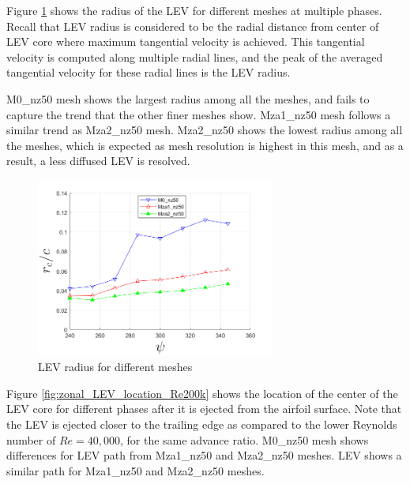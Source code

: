 Figure \ref{fig:zonal_LEV_radius_Re200k} shows the radius of the LEV for different meshes at multiple phases.
Recall that LEV radius is considered to be
the radial distance from center of LEV core where maximum tangential velocity is achieved. This tangential velocity is computed along multiple radial lines, and the peak of the averaged tangential velocity for these radial lines is the LEV radius.

M0\_nz50 mesh shows the largest radius among all the meshes, and fails to capture the trend that the other finer meshes show.
Mza1\_nz50 mesh follows a similar trend as Mza2\_nz50 mesh.
Mza2\_nz50 shows the lowest radius among all the meshes, which is expected as mesh resolution is highest in this mesh, and as a result, a less diffused LEV is resolved.


\begin{figure}[H]
	\centering
	\includegraphics[width=0.7\textwidth]{figures/zonal_adapt_results/LEV_Re200k/LEV_radius_vp}
	\caption{ LEV radius for different meshes}
	\label{fig:zonal_LEV_radius_Re200k}
\end{figure}

Figure \ref{fig:zonal_LEV_location_Re200k} shows the location of the center of the LEV core for different phases after it is ejected from the airfoil surface.
Note that the LEV is ejected closer to the trailing edge as compared to the lower Reynolds number of $Re=40,000$, for the same advance ratio.
M0\_nz50 mesh shows differences for LEV path from Mza1\_nz50 and Mza2\_nz50 meshes. LEV shows a similar path for Mza1\_nz50 and Mza2\_nz50 meshes.

